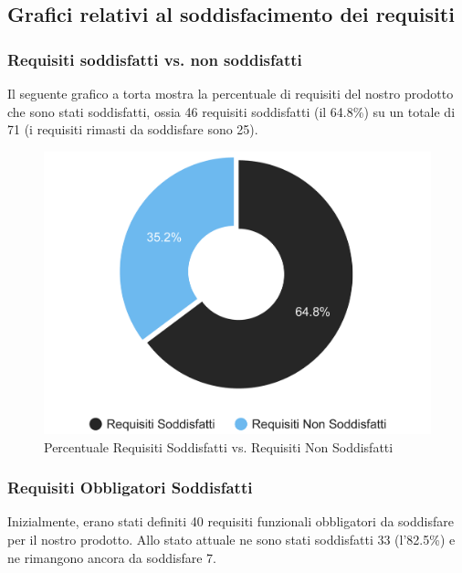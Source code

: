 \subsection{Grafici relativi al soddisfacimento dei requisiti}

\subsubsection{Requisiti soddisfatti vs. non soddisfatti}

Il seguente grafico a torta mostra la percentuale di requisiti del nostro prodotto che sono stati soddisfatti, ossia 46 requisiti soddisfatti (il 64.8\%) su un totale di 71 (i requisiti rimasti da soddisfare sono 25).

\begin{figure}[H]
    \centering
    \includegraphics[scale=0.7]{Contenuto/Immagini/ReqSoddisfatti.png}
    \caption{Percentuale Requisiti Soddisfatti vs. Requisiti Non Soddisfatti}
\end{figure}

\subsubsection{Requisiti Obbligatori Soddisfatti}

Inizialmente, erano stati definiti 40 requisiti funzionali obbligatori da soddisfare per il nostro prodotto. Allo stato attuale ne sono stati soddisfatti 33 (l'82.5\%) e ne rimangono ancora da soddisfare 7.

